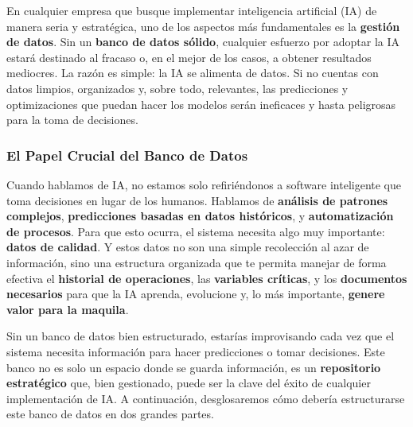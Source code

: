 \documentclass[
  10pt,
  letterpaper,
]{book}
\begin{document}
En cualquier empresa que busque implementar inteligencia artificial (IA)
de manera seria y estratégica, uno de los aspectos más fundamentales es
la \textbf{gestión de datos}. Sin un \textbf{banco de datos sólido},
cualquier esfuerzo por adoptar la IA estará destinado al fracaso o, en
el mejor de los casos, a obtener resultados mediocres. La razón es
simple: la IA se alimenta de datos. Si no cuentas con datos limpios,
organizados y, sobre todo, relevantes, las predicciones y optimizaciones
que puedan hacer los modelos serán ineficaces y hasta peligrosas para la
toma de decisiones.

\subsubsection{El Papel Crucial del Banco de
Datos}\label{el-papel-crucial-del-banco-de-datos}

Cuando hablamos de IA, no estamos solo refiriéndonos a software
inteligente que toma decisiones en lugar de los humanos. Hablamos de
\textbf{análisis de patrones complejos}, \textbf{predicciones basadas en
datos históricos}, y \textbf{automatización de procesos}. Para que esto
ocurra, el sistema necesita algo muy importante: \textbf{datos de
calidad}. Y estos datos no son una simple recolección al azar de
información, sino una estructura organizada que te permita manejar de
forma efectiva el \textbf{historial de operaciones}, las
\textbf{variables críticas}, y los \textbf{documentos necesarios} para
que la IA aprenda, evolucione y, lo más importante, \textbf{genere valor
para la maquila}.

Sin un banco de datos bien estructurado, estarías improvisando cada vez
que el sistema necesita información para hacer predicciones o tomar
decisiones. Este banco no es solo un espacio donde se guarda
información, es un \textbf{repositorio estratégico} que, bien
gestionado, puede ser la clave del éxito de cualquier implementación de
IA. A continuación, desglosaremos cómo debería estructurarse este banco
de datos en dos grandes partes.
\end{document}
